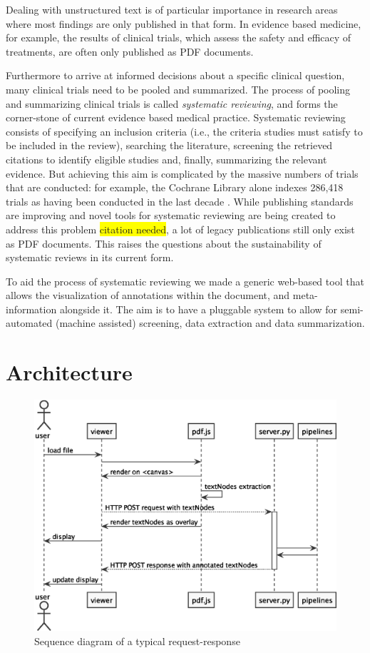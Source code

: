 \documentclass[runningheads,a4paper]{llncs}
\newcommand{\highlight}[1]{\colorbox{yellow}{#1}}
\begin{document}
Dealing with unstructured text is of particular importance in research areas where most findings are only published in that form.
In evidence based medicine, for example, the results of clinical trials, which assess the safety and efficacy of treatments, are often only published as PDF documents.

Furthermore to arrive at informed decisions about a specific clinical question, many clinical trials need to be pooled and summarized.
The process of pooling and summarizing clinical trials is called \emph{systematic reviewing}, and forms the corner-stone of current evidence based medical practice.
Systematic reviewing consists of specifying an inclusion criteria (i.e., the criteria studies must satisfy to be included in the review), searching the literature, screening the retrieved citations to identify eligible studies and, finally, summarizing the relevant evidence.
But achieving this aim is complicated by the massive numbers of trials that are conducted: for example, the Cochrane Library alone indexes 286,418 trials as having been conducted in the last decade \cite{valkenhoef2012}.
While publishing standards are improving and novel tools for systematic reviewing are being created to address this problem \highlight{citation needed}, a lot of legacy publications still only exist as PDF documents.
This raises the questions about the sustainability of systematic reviews in its current form.

To aid the process of systematic reviewing we made a generic web-based tool that allows the visualization of annotations within the document, and meta-information alongside it.
The aim is to have a pluggable system to allow for semi-automated (machine assisted) screening, data extraction and data summarization.
\section{Architecture}
\label{sec-2}

\begin{figure}[htb]
\centering
\includegraphics[width=.9\linewidth]{sequence_diagram.eps}
\caption{\label{fig:sequence}Sequence diagram of a typical request-response}
\end{figure}
\end{document}
